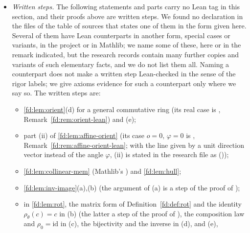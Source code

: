 {\begin{itemize}
  (\ref{fd:lem:support-sum});  (\ref{fd:lem:four-positive});
   (\ref{fd:lem:pos-triples});
   (\ref{fd:lem:neg-triples});
   (\ref{fd:lem:pos-cycle}); 
  (\ref{fd:lem:inv-image}); , ,
  ,  (\ref{fd:lem:rot}).
\item \emph{Written steps.} The following statements and parts carry no Lean tag in this section, and
  their proofs above are written steps. We found no declaration in the files of the table of sources that
  states one of them in the form given here. Several of them have Lean counterparts in another form,
  special cases or variants, in the project or in Mathlib; we name some of these, here or in the remark
  indicated, but the research records contain many further copies and variants of such elementary facts,
  and we do not list them all. Naming a counterpart does not make a written step Lean-checked in the sense
  of the rigor labels; we give axioms evidence for such a counterpart only where we say so. The written
  steps are:
  \begin{itemize}
  \item \ref{fd:lem:orient}(d) for a general commutative ring (its real case is
    , Remark~\ref{fd:rem:orient-lean}) and (e);
  \item part (ii) of \ref{fd:lem:affine-orient} (its case $o=0$, $\varphi=0$ is ,
    Remark~\ref{fd:rem:affine-orient-lean}; with the line given by a unit direction vector instead of the
    angle $\varphi$, (ii) is stated in the research file  as
     ());
  \item \ref{fd:lem:collinear-mem} (Mathlib's ) and \ref{fd:lem:hull};
  \item \ref{fd:lem:inv-image}(a),(b) (the argument of (a) is a step of the proof of
    );
  \item in \ref{fd:lem:rot}, the matrix form of Definition~\ref{fd:def:rot} and the identity
    $\rho_\theta(c)=c$ in (b) (the latter a step of the proof of ),
    the composition law and $\rho_0=\mathrm{id}$ in (c), the bijectivity and the inverse in (d), and (e),

\end{itemize}
\end{itemize}}
